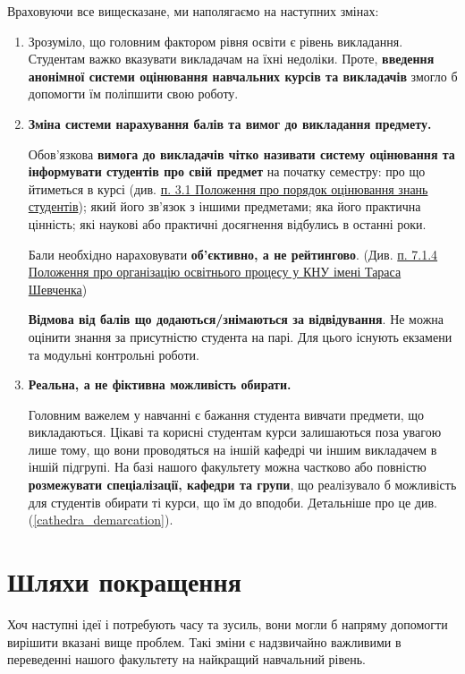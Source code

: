 \documentclass[14pt, a4paper]{extarticle}  %
\begin{document}
Враховуючи все вищесказане, ми наполягаємо на наступних змінах:
\begin{enumerate}
    \item  
    Зрозуміло, що головним фактором рівня освіти є рівень викладання. Студентам важко вказувати викладачам на їхні недоліки. Проте, \textbf{ введення анонімної системи оцінювання навчальних курсів та викладачів} змогло б допомогти їм поліпшити свою роботу. 
    
    \item  \textbf{Зміна системи нарахування балів та вимог до викладання предмету.}
    
    Обов'язкова \textbf{вимога до викладачів чітко називати систему оцінювання та інформувати студентів про свій предмет} на початку семестру: про що йтиметься в курсі (див. \href{nmc.univ.kiev.ua/docs/POLOJENNIA-2010-1.doc}{п. 3.1 Положення про порядок оцінювання знань студентів}); який його зв'язок з іншими предметами; яка його практична цінність; які наукові або практичні досягнення відбулись в останні роки. 
    
    Бали необхідно нараховувати \textbf{об'єктивно, а не рейтингово}. (Див. \href{http://nmc.univ.kiev.ua/docs/Poloz_org_osv_proc-2018.pdf}{п. 7.1.4 Положення про організацію освітнього процесу у КНУ імені Тараса Шевченка})
    
    \textbf{Відмова від балів що додаються/знімаються за відвідування}. Не можна оцінити знання за присутністю студента на парі. Для цього існують екзамени та модульні контрольні роботи. 
    
    \item \textbf{Реальна, а не фіктивна можливість обирати.} 
    
    Головним важелем у навчанні є бажання студента вивчати предмети, що викладаються. Цікаві та корисні студентам курси залишаються поза увагою лише тому, що вони проводяться на іншій кафедрі чи іншим викладачем в іншій підгрупі. На базі нашого факультету можна частково або повністю \textbf{розмежувати спеціалізації, кафедри та групи}, що реалізувало б можливість для студентів обирати ті курси, що їм до вподоби. Детальніше про це див. (\ref{cathedra_demarcation}). 
\end{enumerate}

\newpage
\section{Шляхи покращення}

Хоч наступні ідеї і потребують часу та зусиль, вони могли б напряму допомогти  вирішити вказані вище проблем. Такі зміни є надзвичайно важливими в переведенні нашого факультету на найкращий навчальний рівень.
\end{document}
